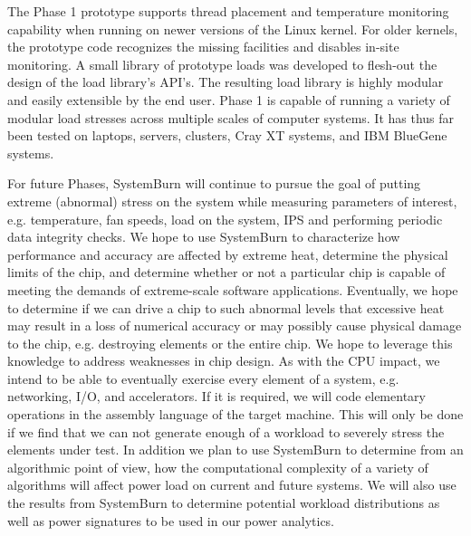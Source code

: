 The Phase 1 prototype supports thread placement and temperature monitoring
capability when running on newer versions of the Linux kernel. For
older kernels, the prototype code recognizes the missing facilities
and disables in-site monitoring.  A small library of prototype loads
was developed to flesh-out the design of the load library's API's. The
resulting load library is highly modular and easily extensible by the end
user. Phase 1 is capable of running a variety of modular load stresses
across multiple scales of computer systems. It has thus far been tested
on laptops, servers, clusters, Cray XT systems, and IBM BlueGene systems.

For future Phases, SystemBurn will continue to pursue the goal of putting
extreme (abnormal) stress on the system while measuring parameters of
interest, e.g. temperature, fan speeds, load on the system, IPS and
performing periodic data integrity checks. We hope to use SystemBurn to
characterize how performance and accuracy are affected by extreme heat,
determine the physical limits of the chip, and determine whether or not
a particular chip is capable of meeting the demands of extreme-scale
software applications. Eventually, we hope to determine if we can drive
a chip to such abnormal levels that excessive heat may result in a loss
of numerical accuracy or may possibly cause physical damage to the chip,
e.g. destroying elements or the entire chip. We hope to leverage this
knowledge to address weaknesses in chip design. As with the CPU impact,
we intend to be able to eventually exercise every element of a system,
e.g. networking, I/O, and accelerators. If it is required, we will code
elementary operations in the assembly language of the target machine.
This will only be done if we find that we can not generate enough of
a workload to severely stress the elements under test. In addition we
plan to use SystemBurn to determine from an algorithmic point of view,
how the computational complexity of a variety of algorithms will affect
power load on current and future systems. We will also use the results
from SystemBurn to determine potential workload distributions as well
as power signatures to be used in our power analytics.

